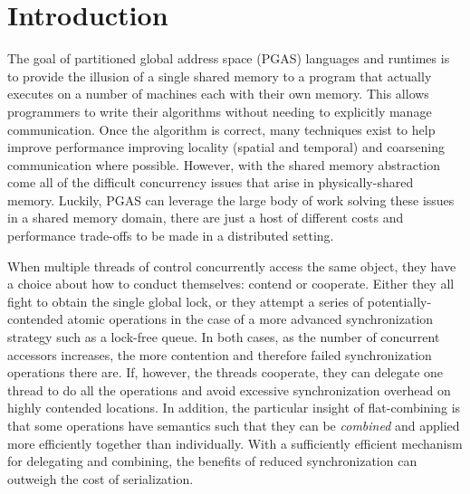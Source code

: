 \section{Introduction}


The goal of partitioned global address space (PGAS) languages and runtimes is to provide the illusion of a single shared memory to a program that actually executes on a number of machines each with their own memory. This allows programmers to write their algorithms without needing to explicitly manage communication. Once the algorithm is correct, many techniques exist to help improve performance improving locality (spatial and temporal) and coarsening communication where possible. However, with the shared memory abstraction come all of the difficult concurrency issues that arise in physically-shared memory. Luckily, PGAS can leverage the large body of work solving these issues in a shared memory domain, there are just a host of different costs and performance trade-offs to be made in a distributed setting.

When multiple threads of control concurrently access the same object, they have a choice about how to conduct themselves: contend or cooperate. Either they all fight to obtain the single global lock, or they attempt a series of potentially-contended atomic operations in the case of a more advanced synchronization strategy such as a lock-free queue. In both cases, as the number of concurrent accessors increases, the more contention and therefore failed synchronization operations there are. If, however, the threads cooperate, they can delegate one thread to do all the operations and avoid excessive synchronization overhead on highly contended locations. In addition, the particular insight of flat-combining is that some operations have semantics such that they can be \emph{combined} and applied more efficiently together than individually. With a sufficiently efficient mechanism for delegating and combining, the benefits of reduced synchronization can outweigh the cost of serialization.
